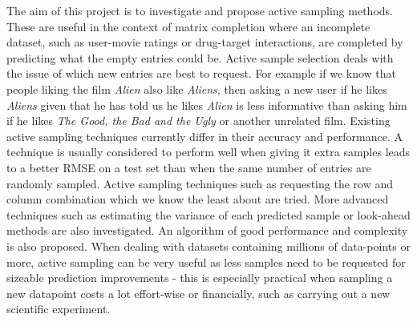 


\begin{abstractslong}    %

The aim of this project is to investigate and propose active sampling methods. These are useful in the context of matrix completion where an incomplete dataset, such as user-movie ratings or drug-target interactions, are completed by predicting what the empty entries could be. Active sample selection deals with the issue of which new entries are best to request. For example if we know that people liking the film \textit{Alien} also like \textit{Aliens}, then asking a new user if he likes \textit{Aliens} given that he has told us he likes  \textit{Alien} is less informative than asking him if he likes \textit{The Good, the Bad and the Ugly} or another unrelated film. 
Existing active sampling techniques currently differ in their accuracy and performance. A technique is usually considered to perform well when giving it extra samples leads to a better RMSE on a test set than when the same number of entries are randomly sampled. Active sampling techniques such as requesting the row and column combination which we know the least about are tried. More advanced techniques such as estimating the variance of each predicted sample or look-ahead methods are also investigated. An algorithm of good performance and complexity is also proposed. When dealing with  datasets containing millions of data-points or more, active sampling can be very useful as less samples need to be requested for sizeable prediction improvements - this is especially practical when sampling a new datapoint costs a lot effort-wise or financially, such as carrying out a new scientific experiment.
 


\end{abstractslong}



